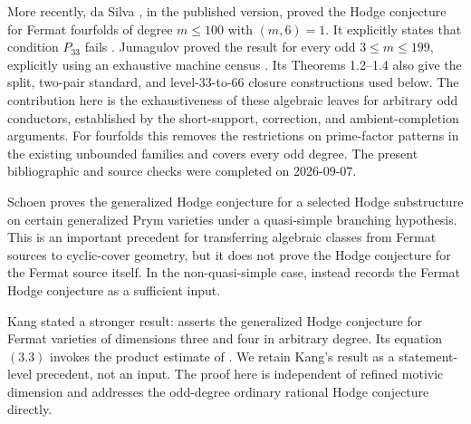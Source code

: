 \documentclass[11pt]{amsart}
\numberwithin{theorem}{section}
\theoremstyle{remark}
\numberwithin{equation}{section}
\begin{document}
More recently, da Silva
\cite[Proposition 3.1, p.~4]{dasilva2021}, in the published version, proved the Hodge
conjecture for Fermat fourfolds of degree \(m\le100\) with \((m,6)=1\).
It explicitly states that condition \(P_{33}\) fails
\cite[Proposition 3.4, p.~5]{dasilva2021}. Jumagulov \cite[Theorem 1.1, p.~2]{jumagulov2026} proved the result
for every odd \(3\le m\le199\), explicitly using an exhaustive machine census
\cite[Abstract, p.~1]{jumagulov2026}. Its Theorems 1.2--1.4 also give the split,
two-pair standard, and level-33-to-66 closure constructions used below.
The contribution here is the exhaustiveness of these algebraic leaves
for arbitrary odd conductors, established by the short-support,
correction, and ambient-completion arguments. For fourfolds this removes
the restrictions on prime-factor patterns in the existing unbounded
families and covers every odd degree. The present bibliographic and
source checks were completed on 2026-09-07.

Schoen \cite[Theorem 3.4, pp.~145--146]{schoen1989} proves the generalized Hodge conjecture
for a selected Hodge substructure on certain generalized Prym varieties under
a quasi-simple branching hypothesis. This is an important precedent for
transferring algebraic classes from Fermat sources to cyclic-cover geometry,
but it does not prove the Hodge conjecture for the Fermat source itself. In
the non-quasi-simple case, \cite[Remark 3.5, p.~146]{schoen1989} instead records the Fermat
Hodge conjecture as a sufficient input.

Kang stated a stronger result: \cite[Corollary 3.2, p.~227]{kang2016} asserts the generalized
Hodge conjecture for Fermat varieties of dimensions three and four in arbitrary
degree. Its equation \((3.3)\) invokes the product estimate of
\cite[Proposition 2.2(iv), pp.~521--522]{kang2015}. We retain Kang's result as a
statement-level precedent, not an input. The proof here is independent of
refined motivic dimension and addresses the odd-degree ordinary rational
Hodge conjecture directly.
\end{document}
